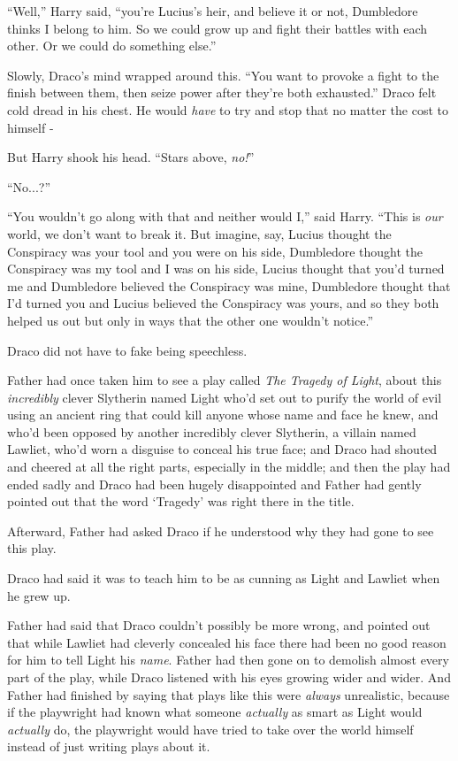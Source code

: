 ``Well,'' Harry said, ``you're Lucius's heir, and believe it or not, Dumbledore thinks I belong to him. So we could grow up and fight their battles with each other. Or we could do something else.''

Slowly, Draco's mind wrapped around this. ``You want to provoke a fight to the finish between them, then seize power after they're both exhausted.'' Draco felt cold dread in his chest. He would \emph{have} to try and stop that no matter the cost to himself -

But Harry shook his head. ``Stars above, \emph{no!}''

``No...?''

``You wouldn't go along with that and neither would I,'' said Harry. ``This is \emph{our} world, we don't want to break it. But imagine, say, Lucius thought the Conspiracy was your tool and you were on his side, Dumbledore thought the Conspiracy was my tool and I was on his side, Lucius thought that you'd turned me and Dumbledore believed the Conspiracy was mine, Dumbledore thought that I'd turned you and Lucius believed the Conspiracy was yours, and so they both helped us out but only in ways that the other one wouldn't notice.''

Draco did not have to fake being speechless.

Father had once taken him to see a play called \emph{The Tragedy of Light}, about this \emph{incredibly} clever Slytherin named Light who'd set out to purify the world of evil using an ancient ring that could kill anyone whose name and face he knew, and who'd been opposed by another incredibly clever Slytherin, a villain named Lawliet, who'd worn a disguise to conceal his true face; and Draco had shouted and cheered at all the right parts, especially in the middle; and then the play had ended sadly and Draco had been hugely disappointed and Father had gently pointed out that the word `Tragedy' was right there in the title.

Afterward, Father had asked Draco if he understood why they had gone to see this play.

Draco had said it was to teach him to be as cunning as Light and Lawliet when he grew up.

Father had said that Draco couldn't possibly be more wrong, and pointed out that while Lawliet had cleverly concealed his face there had been no good reason for him to tell Light his \emph{name}. Father had then gone on to demolish almost every part of the play, while Draco listened with his eyes growing wider and wider. And Father had finished by saying that plays like this were \emph{always} unrealistic, because if the playwright had known what someone \emph{actually} as smart as Light would \emph{actually} do, the playwright would have tried to take over the world himself instead of just writing plays about it.

